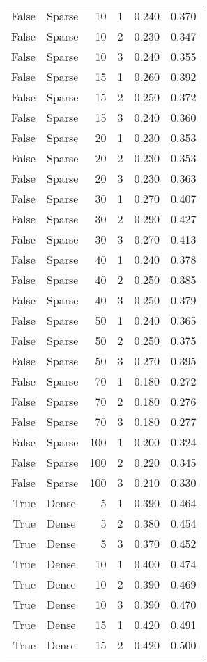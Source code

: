 \begin{tabular}{rlrrrr}
False & Sparse & 10 & 1 & 0.240 & 0.370 \\
False & Sparse & 10 & 2 & 0.230 & 0.347 \\
False & Sparse & 10 & 3 & 0.240 & 0.355 \\
False & Sparse & 15 & 1 & 0.260 & 0.392 \\
False & Sparse & 15 & 2 & 0.250 & 0.372 \\
False & Sparse & 15 & 3 & 0.240 & 0.360 \\
False & Sparse & 20 & 1 & 0.230 & 0.353 \\
False & Sparse & 20 & 2 & 0.230 & 0.353 \\
False & Sparse & 20 & 3 & 0.230 & 0.363 \\
False & Sparse & 30 & 1 & 0.270 & 0.407 \\
False & Sparse & 30 & 2 & 0.290 & 0.427 \\
False & Sparse & 30 & 3 & 0.270 & 0.413 \\
False & Sparse & 40 & 1 & 0.240 & 0.378 \\
False & Sparse & 40 & 2 & 0.250 & 0.385 \\
False & Sparse & 40 & 3 & 0.250 & 0.379 \\
False & Sparse & 50 & 1 & 0.240 & 0.365 \\
False & Sparse & 50 & 2 & 0.250 & 0.375 \\
False & Sparse & 50 & 3 & 0.270 & 0.395 \\
False & Sparse & 70 & 1 & 0.180 & 0.272 \\
False & Sparse & 70 & 2 & 0.180 & 0.276 \\
False & Sparse & 70 & 3 & 0.180 & 0.277 \\
False & Sparse & 100 & 1 & 0.200 & 0.324 \\
False & Sparse & 100 & 2 & 0.220 & 0.345 \\
False & Sparse & 100 & 3 & 0.210 & 0.330 \\
True & Dense & 5 & 1 & 0.390 & 0.464 \\
True & Dense & 5 & 2 & 0.380 & 0.454 \\
True & Dense & 5 & 3 & 0.370 & 0.452 \\
True & Dense & 10 & 1 & 0.400 & 0.474 \\
True & Dense & 10 & 2 & 0.390 & 0.469 \\
True & Dense & 10 & 3 & 0.390 & 0.470 \\
True & Dense & 15 & 1 & 0.420 & 0.491 \\
True & Dense & 15 & 2 & 0.420 & 0.500 \\

\end{tabular}

